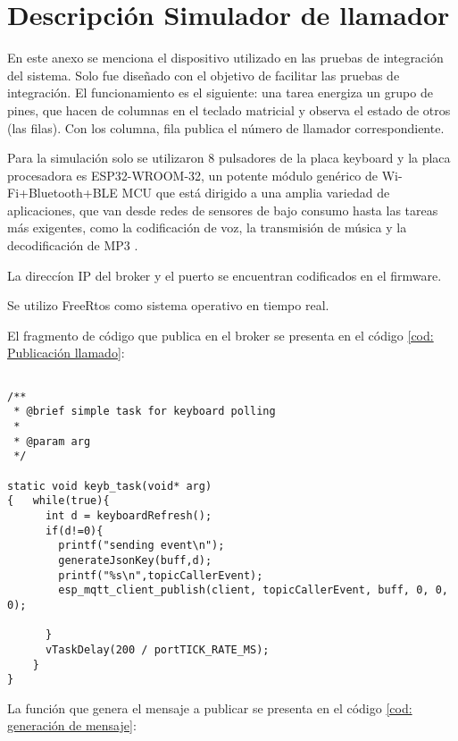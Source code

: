 
\chapter{Descripción Simulador de llamador} %

\label{AppendixA} %

En este anexo se menciona el dispositivo utilizado en las pruebas de integración del sistema. Solo fue diseñado con el objetivo de facilitar las pruebas de integración. El funcionamiento es el siguiente: una tarea energiza un grupo de pines, que hacen de columnas en el teclado matricial y observa el estado de otros (las filas). Con los columna, fila publica el número de llamador correspondiente. 

Para la simulación solo se utilizaron 8 pulsadores de la placa keyboard  \citep{WEBSITE:37} y la placa procesadora es ESP32-WROOM-32, un potente módulo genérico de Wi-Fi+Bluetooth+BLE MCU que está dirigido a una amplia variedad de aplicaciones, que van desde redes de sensores de bajo consumo hasta las tareas más exigentes, como la codificación de voz, la transmisión de música y la decodificación de MP3 \citep{WEBSITE:38}. 

La direccíon IP del broker y el puerto se encuentran codificados en el firmware.

Se utilizo FreeRtos \citep{WEBSITE:40} como sistema operativo en tiempo real.

El fragmento de código que publica en el broker se presenta en el código \ref{cod: Publicación llamado}:

\begin{lstlisting}[label=cod: Publicación llamado,caption=Tarea que publica en el broker la simulación de llamada.]

/**
 * @brief simple task for keyboard polling
 * 
 * @param arg 
 */

static void keyb_task(void* arg)
{   while(true){
      int d = keyboardRefresh();
      if(d!=0){
        printf("sending event\n");
        generateJsonKey(buff,d);
        printf("%s\n",topicCallerEvent);
        esp_mqtt_client_publish(client, topicCallerEvent, buff, 0, 0, 0);

      }
      vTaskDelay(200 / portTICK_RATE_MS);
    }
}
\end{lstlisting}

La función que genera el mensaje a publicar se presenta en el código \ref{cod: generación de mensaje}:

